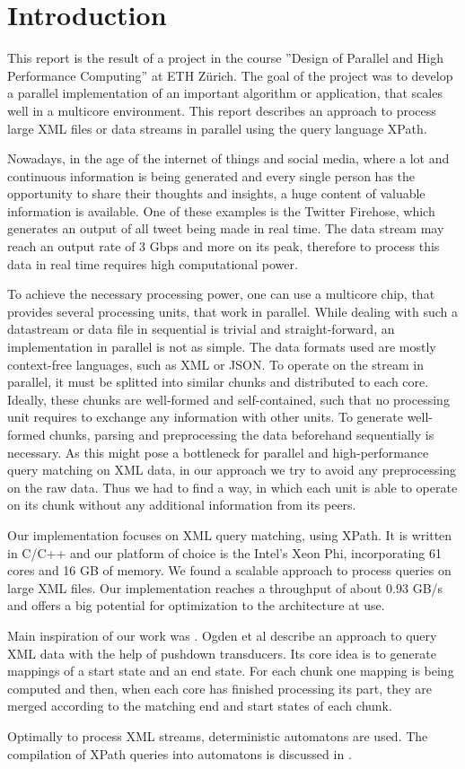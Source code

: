 \section{Introduction}\label{sec:intro}

This report is the result of a project in the course ''Design of Parallel and High Performance Computing'' at ETH Z\"urich. The goal of the project was to develop a parallel implementation of an important algorithm or application, that scales well in a multicore environment. This report describes an approach to process large XML files or data streams in parallel using the query language XPath.

 Nowadays, in the age of the internet of things and social media, where a lot and continuous information is being generated and every single person has the opportunity to share their thoughts and insights, a huge content of valuable information is available. One of these examples is the Twitter Firehose, which generates an output of all tweet being made in real time. The data stream may reach an output rate of 3 Gbps and more on  its peak, therefore to process this data in real time requires high computational power.

To achieve the necessary processing power, one can use a multicore chip, that provides several processing units, that work in parallel. While dealing with such a datastream or data file in sequential is trivial and straight-forward, an implementation in parallel is not as simple. The data formats used are mostly context-free languages, such as XML or JSON. To operate on the stream in parallel, it must be splitted into similar chunks and distributed to each core. Ideally, these chunks are well-formed and self-contained, such that no processing unit requires to exchange any information with other units. To generate well-formed chunks, parsing and preprocessing the data beforehand sequentially is necessary. As this might pose a bottleneck for parallel and high-performance query matching on XML data, in our approach we try to avoid any preprocessing on the raw data. Thus we had to find a way, in which each unit is able to operate on its chunk without any additional information from its peers.

Our implementation focuses on XML query matching, using XPath. It is written in C/C++ and our platform of choice is the Intel's Xeon Phi, incorporating 61 cores and 16 GB of memory. We found a scalable approach to process queries on large XML files. Our implementation reaches a throughput of about 0.93 GB/s and offers a big potential for optimization to the architecture at use. 

 Main inspiration of our work was \cite{Ogden2013}. Ogden et al describe an approach to query XML data with the help of pushdown transducers. Its core idea is to generate mappings of a start state and an end state. For each chunk one mapping is being computed and then, when each core has finished processing its part, they are merged according to the matching end and start states of each chunk.

Optimally to process XML streams, deterministic automatons are used. The compilation of XPath queries into automatons is discussed in \cite{Green2004}.